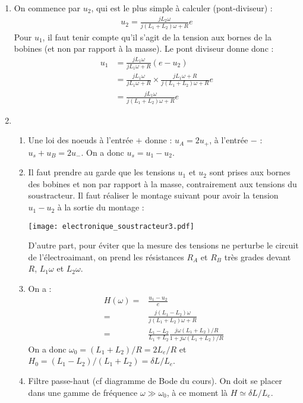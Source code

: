 \begin{correction}

\begin{enumerate}

\item On commence par $u_2$, qui est le plus simple à calculer (pont-diviseur) :
\begin{align*}
	u_2=\frac{jL_2\omega}{j(L_1+L_2)\omega + R}e
\end{align*}
Pour $u_1$, il faut tenir compte qu'il s'agit de la tension aux bornes de la bobines (et non par rapport à la masse). Le pont diviseur donne donc :
\begin{align*}
	u_1&=\frac{jL_1\omega}{jL_1\omega+R}(e-u_2) \\
	&=\frac{jL_1\omega}{jL_1\omega+R}\times\frac{jL_1\omega+R}{j(L_1+L_2)\omega + R}e\\
	&=\frac{jL_1\omega}{j(L_1+L_2)\omega + R}e
\end{align*}
\item

\begin{enumerate}

 \item Une loi des noeuds à l'entrée $+$ donne : $u_A=2u_+$, à l'entrée $-$ : $u_s+u_B=2u_-$. On a donc $u_s=u_1-u_2$.
 
 \item Il faut prendre au garde que les tensions $u_1$ et $u_2$ sont prises aux bornes des bobines et non par rapport à la masse, contrairement aux tensions du soustracteur. Il faut réaliser le montage suivant pour avoir la tension $u_1-u_2$ à la sortie du montage :
 
\texttt{[image: electronique\_soustracteur3.pdf]}

D'autre part, pour éviter que la mesure des tensions ne perturbe le circuit de l'électroaimant, on prend les résistances $R_A$ et $R_B$ très grades devant $R$, $L_1\omega$ et $L_2\omega$.
 
 \item On a :
 \begin{align*}
 	H(\omega)=&\frac{u_1-u_2}{e} \\
 	=&\frac{j(L_1-L_2)\omega}{j(L_1+L_2)\omega+R}\\
 	=&\frac{L_1-L_2}{L_1+L_2}\frac{j\omega(L_1+L_2)/R}{1+j\omega(L_1+L_2)/R}
 \end{align*}
 On a donc $\omega_0=(L_1+L_2)/R=2L_e/R$ et $H_0=(L_1-L_2)/(L_1+L_2)=\delta L/L_e$.

\item Filtre passe-haut (cf diagramme de Bode du cours). On doit se placer dans une gamme de fréquence $\omega\gg\omega_0$, à ce moment là $H\simeq \delta L/L_e$.

\end{enumerate}

\end{enumerate}

\end{correction}